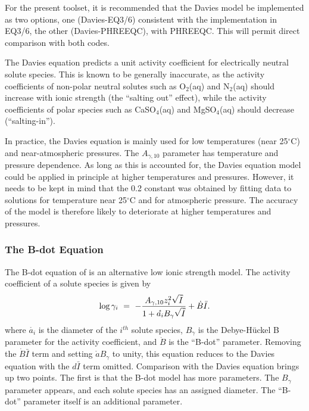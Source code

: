 For the present toolset, it is recommended that the Davies model be
implemented as two options, one (Davies-EQ3/6) consistent with the
implementation in EQ3/6, the other (Davies-PHREEQC), with
PHREEQC. This will permit direct comparison with both codes.

The Davies equation predicts a unit activity coefficient for
electrically neutral solute species. This is known to be generally
inaccurate, as the activity coefficients of non-polar neutral solutes
such as O$_2$(aq) and N$_2$(aq) should increase with ionic strength (the
``salting out'' effect), while the activity coefficients of polar
species such as CaSO$_4$(aq) and MgSO$_4$(aq) should decrease
(``salting-in'').

In practice, the Davies equation is mainly used for low temperatures
(near 25${}^\circ$C) and near-atmospheric pressures. The $A_{\gamma
,10}$ parameter has temperature and pressure dependence. As long as
this is accounted for, the Davies equation model could be applied in
principle at higher temperatures and pressures. However, it needs to
be kept in mind that the 0.2 constant was obtained by fitting data to
solutions for temperature near 25${}^\circ$C and for atmospheric
pressure. The accuracy of the model is therefore likely to deteriorate
at higher temperatures and pressures.

\subsubsection{The B-dot Equation} 
\label{sec:b_dotEquation}

The B-dot equation of \citet{helgeson-1969} is an alternative low ionic
strength model. The activity coefficient of a solute species is given
by
%
\begin{equation}
   \log \gamma _{i}  
      \ =\  - \frac{A_{\gamma ,10} z_{i}^{2} \sqrt{ \bar{I} }}
               {1+ \mathring{a_i} B_{\gamma } \sqrt{\bar{I}}} 
        + \dot{B} \bar{I}.
\end{equation}
%
where $\mathring{a_i}$ is the diameter of the $i^{th}$ solute species,
$B_{\gamma } $ is the Debye-H\"{u}ckel B parameter for the activity
coefficient, and $\dot{B}$ is the ``B-dot'' parameter.  Removing the
$\dot{B}\bar{I}$ term and setting $\mathring{a} B_{\gamma }$ to unity, this
equation reduces to the Davies equation with the $d\bar{I}$ term omitted.
Comparison with the Davies equation brings up two points. The first is
that the B-dot model has more parameters.  The $B_{\gamma}$ parameter
appears, and each solute species has an assigned diameter. The
``B-dot'' parameter itself is an additional parameter.

